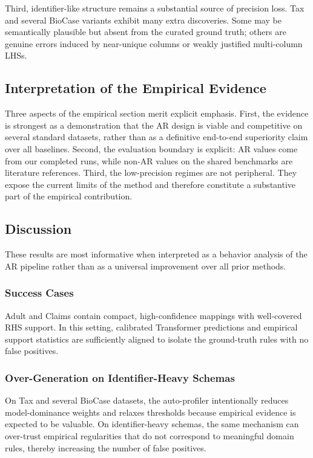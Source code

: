 \documentclass[conference]{IEEEtran}
\begin{document}
Third, identifier-like structure remains a substantial source of precision loss. Tax and several BioCase variants exhibit many extra discoveries. Some may be semantically plausible but absent from the curated ground truth; others are genuine errors induced by near-unique columns or weakly justified multi-column LHSs.

\subsection{Interpretation of the Empirical Evidence}

Three aspects of the empirical section merit explicit emphasis. First, the evidence is strongest as a demonstration that the AR design is viable and competitive on several standard datasets, rather than as a definitive end-to-end superiority claim over all baselines. Second, the evaluation boundary is explicit: AR values come from our completed runs, while non-AR values on the shared benchmarks are literature references. Third, the low-precision regimes are not peripheral. They expose the current limits of the method and therefore constitute a substantive part of the empirical contribution.

\subsection{Discussion}

These results are most informative when interpreted as a behavior analysis of the AR pipeline rather than as a universal improvement over all prior methods.

\subsubsection{Success Cases}

Adult and Claims contain compact, high-confidence mappings with well-covered RHS support. In this setting, calibrated Transformer predictions and empirical support statistics are sufficiently aligned to isolate the ground-truth rules with no false positives.

\subsubsection{Over-Generation on Identifier-Heavy Schemas}

On Tax and several BioCase datasets, the auto-profiler intentionally reduces model-dominance weights and relaxes thresholds because empirical evidence is expected to be valuable. On identifier-heavy schemas, the same mechanism can over-trust empirical regularities that do not correspond to meaningful domain rules, thereby increasing the number of false positives.
\end{document}
